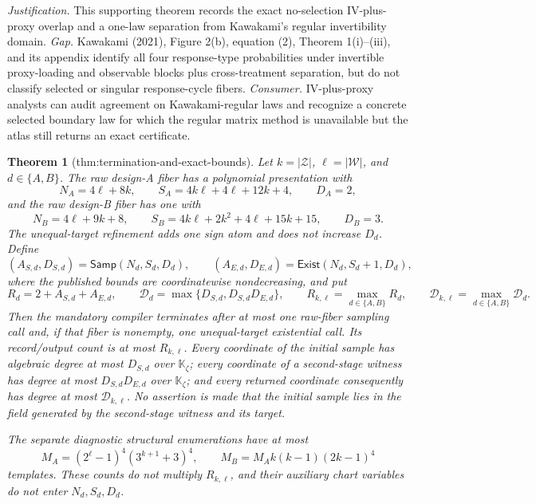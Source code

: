 \documentclass{article}
\newtheorem{theorem}{Theorem}
\begin{document}
\par\smallskip\noindent \textit{Justification.} This supporting theorem records the exact no-selection IV-plus-proxy overlap and a one-law separation from Kawakami's regular invertibility domain. \textit{Gap.} Kawakami (2021), Figure 2(b), equation (2), Theorem 1(i)--(iii), and its appendix identify all four response-type probabilities under invertible proxy-loading and observable blocks plus cross-treatment separation, but do not classify selected or singular response-cycle fibers. \textit{Consumer.} IV-plus-proxy analysts can audit agreement on Kawakami-regular laws and recognize a concrete selected boundary law for which the regular matrix method is unavailable but the atlas still returns an exact certificate.

\begin{theorem}[thm:termination-and-exact-bounds]\label{thm:termination-and-exact-bounds}
Let \(k=|\mathcal Z|\), \(\ell=|\mathcal W|\), and \(d\in\{A,B\}\).  The raw design-A fiber has a polynomial presentation with
\[
 N_A=4\ell+8k,\qquad
 S_A=4k\ell+4\ell+12k+4,\qquad
 D_A=2,
\]
and the raw design-B fiber has one with
\[
 N_B=4\ell+9k+8,\qquad
 S_B=4k\ell+2k^2+4\ell+15k+15,\qquad
 D_B=3.
\]
The unequal-target refinement adds one sign atom and does not increase \(D_d\).  Define
\[
 (A_{S,d},D_{S,d})=\mathsf{Samp}(N_d,S_d,D_d),
 \qquad
 (A_{E,d},D_{E,d})=\mathsf{Exist}(N_d,S_d+1,D_d),
\]
where the published bounds are coordinatewise nondecreasing, and put
\[
 R_d=2+A_{S,d}+A_{E,d},
 \qquad
 \mathcal D_d=\max\{D_{S,d},D_{S,d}D_{E,d}\},
 \qquad
 R_{k,\ell}=\max_{d\in\{A,B\}}R_d,
 \qquad
 \mathcal D_{k,\ell}=\max_{d\in\{A,B\}}\mathcal D_d.
\]
Then the mandatory compiler terminates after at most one raw-fiber sampling call and, if that fiber is nonempty, one unequal-target existential call.  Its record/output count is at most \(R_{k,\ell}\).  Every coordinate of the initial sample has algebraic degree at most \(D_{S,d}\) over \(\mathbb K_{\zeta}\); every coordinate of a second-stage witness has degree at most \(D_{S,d}D_{E,d}\) over \(\mathbb K_{\zeta}\); and every returned coordinate consequently has degree at most \(\mathcal D_{k,\ell}\).  No assertion is made that the initial sample lies in the field generated by the second-stage witness and its target.

The separate diagnostic structural enumerations have at most
\[
 M_A=(2^{\ell}-1)^4(3^{k+1}+3)^4,
 \qquad
 M_B=M_Ak(k-1)(2k-1)^4
\]
templates.  These counts do not multiply \(R_{k,\ell}\), and their auxiliary chart variables do not enter \(N_d,S_d,D_d\).


\end{theorem}
\end{document}

